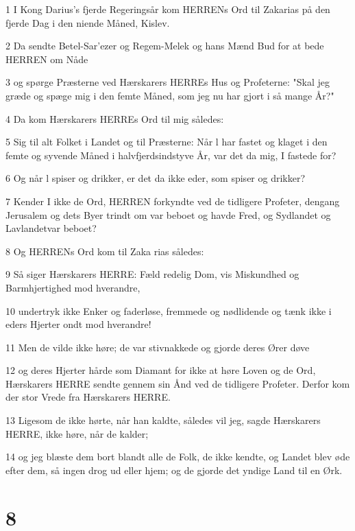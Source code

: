 \par 1 I Kong Darius's fjerde Regeringsår kom HERRENs Ord til Zakarias på den fjerde Dag i den niende Måned, Kislev.
\par 2 Da sendte Betel-Sar'ezer og Regem-Melek og hans Mænd Bud for at bede HERREN om Nåde
\par 3 og spørge Præsterne ved Hærskarers HERREs Hus og Profeterne: "Skal jeg græde og spæge mig i den femte Måned, som jeg nu har gjort i så mange År?"
\par 4 Da kom Hærskarers HERREs Ord til mig således:
\par 5 Sig til alt Folket i Landet og til Præsterne: Når l har fastet og klaget i den femte og syvende Måned i halvfjerdsindstyve År, var det da mig, I fastede for?
\par 6 Og når l spiser og drikker, er det da ikke eder, som spiser og drikker?
\par 7 Kender I ikke de Ord, HERREN forkyndte ved de tidligere Profeter, dengang Jerusalem og dets Byer trindt om var beboet og havde Fred, og Sydlandet og Lavlandetvar beboet?
\par 8 Og HERRENs Ord kom til Zaka rias således:
\par 9 Så siger Hærskarers HERRE: Fæld redelig Dom, vis Miskundhed og Barmhjertighed mod hverandre,
\par 10 undertryk ikke Enker og faderløse, fremmede og nødlidende og tænk ikke i eders Hjerter ondt mod hverandre!
\par 11 Men de vilde ikke høre; de var stivnakkede og gjorde deres Ører døve
\par 12 og deres Hjerter hårde som Diamant for ikke at høre Loven og de Ord, Hærskarers HERRE sendte gennem sin Ånd ved de tidligere Profeter. Derfor kom der stor Vrede fra Hærskarers HERRE.
\par 13 Ligesom de ikke hørte, når han kaldte, således vil jeg, sagde Hærskarers HERRE, ikke høre, når de kalder;
\par 14 og jeg blæste dem bort blandt alle de Folk, de ikke kendte, og Landet blev øde efter dem, så ingen drog ud eller hjem; og de gjorde det yndige Land til en Ørk.

\chapter{8}

